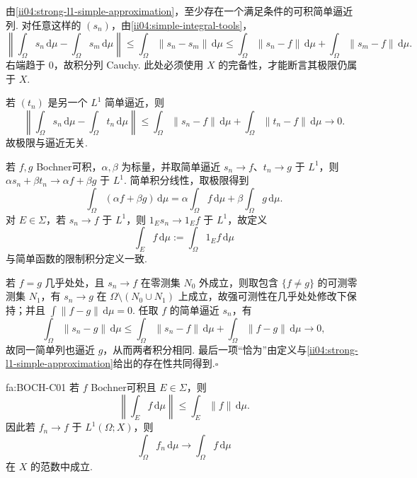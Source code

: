 \begin{FAProof}
由\autoref{ii04:strong-l1-simple-approximation}，至少存在一个满足条件的可积简单逼近列. 对任意这样的 \(\displaystyle(s_n)\)，由\autoref{ii04:simple-integral-tools}，
\[
\left\|\int_\Omega s_n\,\mathrm{d}\mu-
\int_\Omega s_m\,\mathrm{d}\mu\right\|
\leqslant
\int_\Omega\|s_n-s_m\|\,\mathrm{d}\mu
\leqslant
\int_\Omega\|s_n-f\|\,\mathrm{d}\mu+
\int_\Omega\|s_m-f\|\,\mathrm{d}\mu.
\]
右端趋于 \(\displaystyle0\)，故积分列 Cauchy. 此处必须使用 \(\displaystyle X\) 的完备性，才能断言其极限仍属于 \(\displaystyle X\).

若 \(\displaystyle(t_n)\) 是另一个 \(\displaystyle L^1\) 简单逼近，则
\[
\left\|\int_\Omega s_n\,\mathrm{d}\mu-
\int_\Omega t_n\,\mathrm{d}\mu\right\|
\leqslant
\int_\Omega\|s_n-f\|\,\mathrm{d}\mu+
\int_\Omega\|t_n-f\|\,\mathrm{d}\mu
\longrightarrow0.
\]
故极限与逼近无关.

若 \(\displaystyle f,g\) Bochner可积，\(\displaystyle\alpha,\beta\) 为标量，并取简单逼近 \(\displaystyle s_n\to f\)、\(\displaystyle t_n\to g\) 于 \(\displaystyle L^1\)，则 \(\displaystyle\alpha s_n+\beta t_n\to\alpha f+\beta g\) 于 \(\displaystyle L^1\). 简单积分线性，取极限得到
\[
\int_\Omega(\alpha f+\beta g)\,\mathrm{d}\mu
=
\alpha\int_\Omega f\,\mathrm{d}\mu+
\beta\int_\Omega g\,\mathrm{d}\mu.
\]
对 \(\displaystyle E\in\Sigma\)，若 \(\displaystyle s_n\to f\) 于 \(\displaystyle L^1\)，则 \(\displaystyle1_Es_n\to1_Ef\) 于 \(\displaystyle L^1\)，故定义
\[
\int_Ef\,\mathrm{d}\mu
:=
\int_\Omega1_Ef\,\mathrm{d}\mu
\]
与简单函数的限制积分定义一致.

若 \(\displaystyle f=g\) 几乎处处，且 \(\displaystyle s_n\to f\) 在零测集 \(\displaystyle N_0\) 外成立，则取包含 \(\displaystyle\{f\neq g\}\) 的可测零测集 \(\displaystyle N_1\)，有 \(\displaystyle s_n\to g\) 在 \(\displaystyle\Omega\setminus(N_0\cup N_1)\) 上成立，故强可测性在几乎处处修改下保持；并且 \(\displaystyle\int\|f-g\|\,\mathrm{d}\mu=0\). 任取 \(\displaystyle f\) 的简单逼近 \(\displaystyle s_n\)，有
\[
\int_\Omega\|s_n-g\|\,\mathrm{d}\mu
\leqslant
\int_\Omega\|s_n-f\|\,\mathrm{d}\mu+
\int_\Omega\|f-g\|\,\mathrm{d}\mu
\longrightarrow0,
\]
故同一简单列也逼近 \(\displaystyle g\)，从而两者积分相同. 最后一项“恰为”由定义与\autoref{ii04:strong-l1-simple-approximation}给出的存在性共同得到.\hfill\(\square\)
\end{FAProof}

\begin{FAProposition}[C][Bochner积分范数估计]{fa:BOCH-C01}
若 \(\displaystyle f\) Bochner可积且 \(\displaystyle E\in\Sigma\)，则
\[
\left\|\int_Ef\,\mathrm{d}\mu\right\|
\leqslant
\int_E\|f\|\,\mathrm{d}\mu.
\]
因此若 \(\displaystyle f_n\to f\) 于 \(\displaystyle L^1(\Omega;X)\)，则
\[
\int_\Omega f_n\,\mathrm{d}\mu
\longrightarrow
\int_\Omega f\,\mathrm{d}\mu
\]
在 \(\displaystyle X\) 的范数中成立.
\end{FAProposition}

